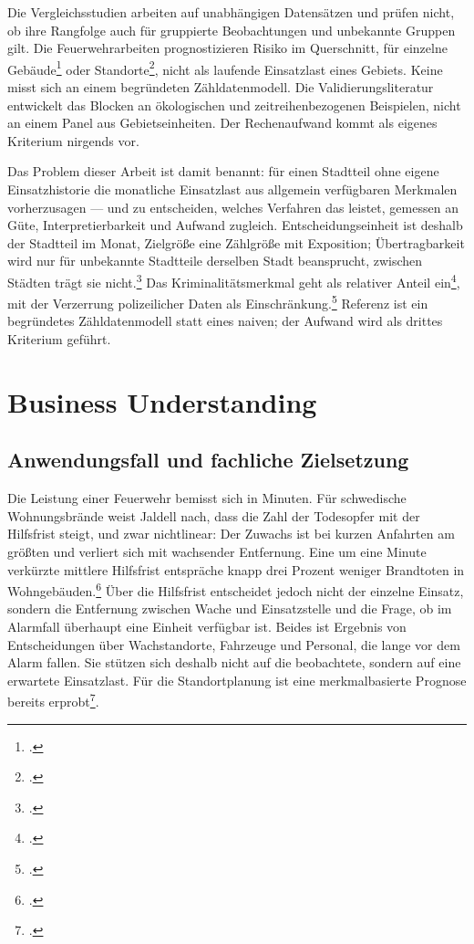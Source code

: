 \documentclass[12pt,a4paper]{article}
\begin{document}
Die Vergleichsstudien arbeiten auf unabhängigen Datensätzen und prüfen nicht, ob ihre Rangfolge auch für gruppierte Beobachtungen und unbekannte Gruppen gilt. Die Feuerwehrarbeiten prognostizieren Risiko im Querschnitt, für einzelne Gebäude\footcite[185]{Madaio2016} oder Standorte\footcite[34]{Dey2023}, nicht als laufende Einsatzlast eines Gebiets. Keine misst sich an einem begründeten Zähldatenmodell. Die Validierungsliteratur entwickelt das Blocken an ökologischen und zeitreihenbezogenen Beispielen, nicht an einem Panel aus Gebietseinheiten. Der Rechenaufwand kommt als eigenes Kriterium nirgends vor.

Das Problem dieser Arbeit ist damit benannt: für einen Stadtteil ohne eigene Einsatzhistorie die monatliche Einsatzlast aus allgemein verfügbaren Merkmalen vorherzusagen — und zu entscheiden, welches Verfahren das leistet, gemessen an Güte, Interpretierbarkeit und Aufwand zugleich. Entscheidungseinheit ist deshalb der Stadtteil im Monat, Zielgröße eine Zählgröße mit Exposition; Übertragbarkeit wird nur für unbekannte Stadtteile derselben Stadt beansprucht, zwischen Städten trägt sie nicht.\footcite[14]{Jennings1999} Das Kriminalitätsmerkmal geht als relativer Anteil ein\footcite[264]{Brantingham1997}, mit der Verzerrung polizeilicher Daten als Einschränkung.\footcite[15]{LumIsaac2016} Referenz ist ein begründetes Zähldatenmodell statt eines naiven; der Aufwand wird als drittes Kriterium geführt.

\section{Business Understanding}
\subsection{Anwendungsfall und fachliche Zielsetzung}
\label{sec:anwendungsfall}
Die Leistung einer Feuerwehr bemisst sich in Minuten. Für schwedische Wohnungsbrände weist Jaldell nach, dass die Zahl der Todesopfer mit der Hilfsfrist steigt, und zwar nichtlinear: Der Zuwachs ist bei kurzen Anfahrten am größten und verliert sich mit wachsender Entfernung. Eine um eine Minute verkürzte mittlere Hilfsfrist entspräche knapp drei Prozent weniger Brandtoten in Wohngebäuden.\footcite[706]{Jaldell2017} Über die Hilfsfrist entscheidet jedoch nicht der einzelne Einsatz, sondern die Entfernung zwischen Wache und Einsatzstelle und die Frage, ob im Alarmfall überhaupt eine Einheit verfügbar ist. Beides ist Ergebnis von Entscheidungen über Wachstandorte, Fahrzeuge und Personal, die lange vor dem Alarm fallen. Sie stützen sich deshalb nicht auf die beobachtete, sondern auf eine erwartete Einsatzlast. Für die Standortplanung ist eine merkmalbasierte Prognose bereits erprobt\footcite[34]{Dey2023}.
\end{document}
